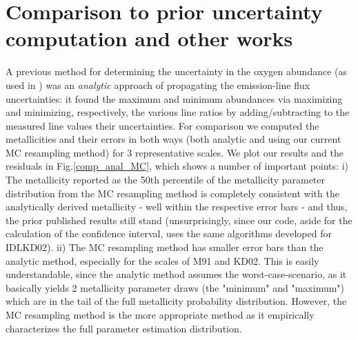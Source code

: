 \documentclass{emulateapj}
\begin{document}
\section{Comparison to prior uncertainty computation and other works }\label{comp_sec}


A previous method for determining the uncertainty in the oxygen abundance (as used in \citealt{modjaz08_Z,kewley10,rupke10,modjaz11}) was an \emph{analytic} approach of propagating the emission-line flux uncertainties: it found the maximum and minimum abundances via maximizing and minimizing, respectively, the various line ratios by adding/subtracting to the measured line values their uncertainties. For comparison we computed the metallicities and their errors in both ways (both analytic and using our current MC resampling method) for 3 representative scales. We plot our results and the residuals in Fig.\ref{comp_anal_MC}, which shows a number of important points: i) The metallicity reported as the 50th percentile of the metallicity parameter distribution from the MC resampling method is completely consistent with the analytically derived metallicity -  well within the respective error bars - and thus, the prior published results still stand (unsurprisingly, since our code, aside for the calculation of the confidence interval, uses the same algorithms developed for IDLKD02). ii) The MC resampling method has smaller error bars than the analytic method, especially for the scales of M91 and KD02. This is easily understandable, since the analytic method assumes the worst-case-scenario, as it basically yields 2 metallicity parameter draws (the "minimum" and "maximum") which are in the tail of the full metallicity probability distribution. However, the MC resampling method is the more appropriate method as it empirically characterizes the full parameter estimation distribution.
\end{document}
